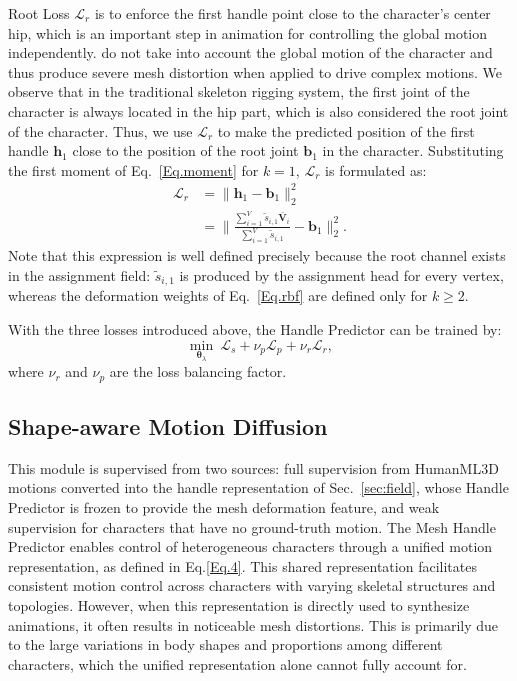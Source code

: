 \documentclass[lettersize,journal]{IEEEtran}
\newcommand{\blu}[1]{\texorpdfstring{{\leavevmode\color{blue}#1}}{#1}}
\begin{document}
Root Loss $\mathcal{L}_r$ is to enforce the first handle point close to the character's center hip, which is an important step in animation for controlling the global motion independently. \cite{liao2022skeleton} do not take into account the global motion of the character and thus produce severe mesh distortion when applied to drive complex motions. We observe that in the traditional skeleton rigging system, the first joint of the character is always located in the hip part, which is also considered the root joint of the character. Thus, we use $\mathcal{L}_r$ to make the predicted position of the first handle $\bm{h}_{1}$ close to the position of the root joint $\bm{b}_{1}$ in the character. Substituting the first moment of Eq.~\ref{Eq.moment} for $k=1$, $\mathcal{L}_r$ is formulated as:
\begin{equation} \label{Eq.6}
\begin{aligned}
\mathcal{L}_r & = \lVert \bm{h}_{1} - \bm{b}_{1} \rVert_{2}^{2} \\ & = \Bigg\lVert \frac{\sum_{i=1}^{V}\tilde{s}_{i,1}\bar{\bm{V}}_i}{\sum_{i=1}^{V}\tilde{s}_{i,1}} - \bm{b}_{1} \Bigg\rVert_{2}^{2}.
\end{aligned}
\end{equation}
Note that this expression is well defined precisely because the root channel exists in the
assignment field: $\tilde{s}_{i,1}$ is produced by the assignment head for every vertex,
whereas the deformation weights of Eq.~\ref{Eq.rbf} are defined only for $k \geq 2$.

With the three losses introduced above, the Handle Predictor can be trained by:
\begin{equation} \label{Eq.8}
\min_{\bm{\theta}_\lambda}~\mathcal{L}_{s} + \nu_{p}\mathcal{L}_{p} + \nu_{r}\mathcal{L}_{r},
\end{equation}
where $\nu_{r}$ and $\nu_{p}$ are the loss balancing factor.

\subsection{Shape-aware Motion Diffusion} \label{sec:motion}
\blu{This module is supervised from two sources: full supervision from HumanML3D motions
converted into the handle representation of Sec.~}\ref{sec:field}, \blu{whose Handle Predictor is frozen to
provide the mesh deformation feature, and weak supervision for characters that have no
ground-truth motion.} 
The Mesh Handle Predictor enables control of heterogeneous characters through a unified motion representation, as defined in Eq.\ref{Eq.4}. This shared representation facilitates consistent motion control across characters with varying skeletal structures and topologies. However, when this representation is directly used to synthesize animations, it often results in noticeable mesh distortions. This is primarily due to the large variations in body shapes and proportions among different characters, which the unified representation alone cannot fully account for.
\end{document}
